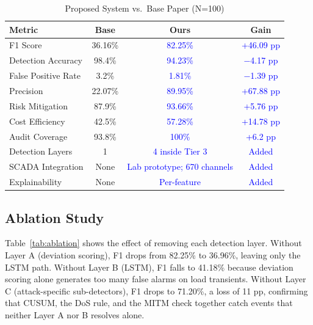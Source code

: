 \documentclass[conference,a4paper]{IEEEtran}
\begin{document}
\begin{table}[htbp]
\caption{Proposed System vs.\ Base Paper (N=100)}
\begin{center}
\begin{tabular}{|l|c|c|c|}
\hline
\textbf{Metric} & \textbf{Base} & \textbf{Ours} & \textbf{Gain} \\
\hline
F1 Score & 36.16\% & \textcolor{blue}{82.25\%} & \textcolor{blue}{+46.09 pp} \\
\hline
Detection Accuracy & 98.4\% & \textcolor{blue}{94.23\%} & \textcolor{blue}{$-$4.17 pp} \\
\hline
False Positive Rate & 3.2\% & \textcolor{blue}{1.81\%} & \textcolor{blue}{$-$1.39 pp} \\
\hline
Precision & 22.07\% & \textcolor{blue}{89.95\%} & \textcolor{blue}{+67.88 pp} \\
\hline
Risk Mitigation & 87.9\% & \textcolor{blue}{93.66\%} & \textcolor{blue}{+5.76 pp} \\
\hline
Cost Efficiency & 42.5\% & \textcolor{blue}{57.28\%} & \textcolor{blue}{+14.78 pp} \\
\hline
Audit Coverage & 93.8\% & \textcolor{blue}{100\%} & \textcolor{blue}{+6.2 pp} \\
\hline
Detection Layers & 1 & \textcolor{blue}{4 inside Tier 3} & \textcolor{blue}{Added} \\
\hline
SCADA Integration & None & \textcolor{blue}{Lab prototype; 670 channels} & \textcolor{blue}{Added} \\
\hline
Explainability & None & \textcolor{blue}{Per-feature} & \textcolor{blue}{Added} \\
\hline
\end{tabular}
\label{tab:base}
\end{center}
\end{table}

\subsection{Ablation Study}

Table~\ref{tab:ablation} shows the effect of removing each detection layer. Without Layer A (deviation scoring), F1 drops from 82.25\% to 36.96\%, leaving only the LSTM path. Without Layer B (LSTM), F1 falls to 41.18\% because deviation scoring alone generates too many false alarms on load transients. Without Layer C (attack-specific sub-detectors), F1 drops to 71.20\%, a loss of 11 pp, confirming that CUSUM, the DoS rule, and the MITM check together catch events that neither Layer A nor B resolves alone.
\end{document}
